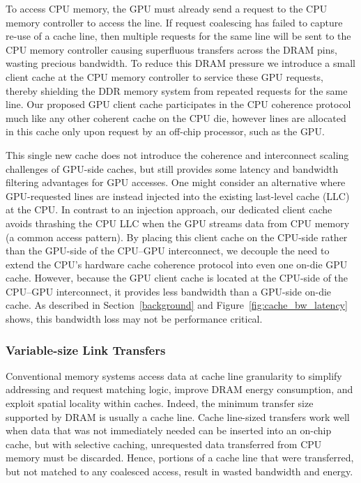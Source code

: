 To access CPU memory, the GPU must already send a request to the CPU
memory controller to access the line. If request coalescing has failed to
capture re-use of a cache line, then multiple requests for the same line will
be sent to the CPU memory controller causing superfluous transfers across the DRAM
pins, wasting precious bandwidth.  To reduce this DRAM pressure we introduce a small 
client cache at the CPU memory controller to service
these GPU requests, thereby shielding the DDR memory system from
repeated requests for the same line.  Our proposed GPU client cache participates in the 
CPU coherence protocol much like any other 
coherent cache on the CPU die, however lines are allocated in this cache only upon 
request by an off-chip processor, such as the GPU\@.

This single new cache does not introduce the 
coherence and interconnect scaling challenges of GPU-side caches,
but still provides some latency and bandwidth filtering advantages
for GPU accesses. One might consider an alternative where GPU-requested lines are instead injected into
the existing last-level cache (LLC) at the CPU.  In contrast to an injection approach, our
dedicated client cache avoids thrashing the CPU LLC 
when the GPU streams data from CPU memory (a common access pattern).
By placing this client cache on the CPU-side rather than the GPU-side of the CPU--GPU 
interconnect, we decouple the need to extend the CPU's hardware cache coherence protocol into even one on-die GPU cache.
However, because the GPU client cache is located at the CPU-side of the CPU--GPU interconnect,
it provides less bandwidth than a GPU-side on-die cache. As described in Section~\ref{background} and 
Figure~\ref{fig:cache_bw_latency} shows, this bandwidth loss may not be performance
critical.

\subsubsection{Variable-size Link Transfers}
\label{variablesizing}

Conventional memory systems access data at cache line granularity to 
simplify addressing and request matching logic, improve DRAM energy consumption, and 
exploit spatial locality within caches.  Indeed, the minimum transfer size supported
by DRAM is usually a cache line.  Cache line-sized transfers work well when data
that was not immediately needed can be inserted into an on-chip cache, but
with selective caching, unrequested data transferred from CPU memory must be discarded.  
Hence, portions of a cache line that
were transferred, but not matched to any coalesced access, result in wasted
bandwidth and energy. 


